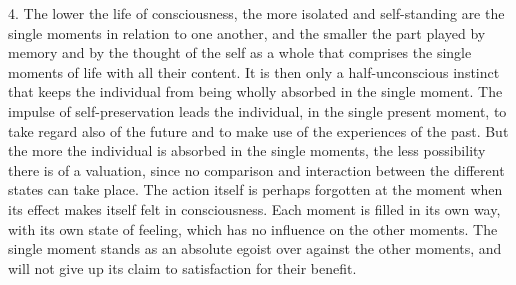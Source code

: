 \documentclass[12pt,a4paper,openany]{book}
\newcommand{\opage}[1]{\marginnote{\footnotesize\textit{[#1]}}}
\begin{document}
4. The lower the life of consciousness, the more isolated and self-standing are the single moments
in relation to one another, and the smaller the part played by memory and by the thought of the self
as a whole that comprises the single moments of life with all their content. It is then only a
half-unconscious instinct that keeps the individual from being wholly absorbed in the single moment.
The impulse of self-preservation leads the individual, in the single present moment, to take regard
also of the future and to make use of the experiences of the past. But the more the individual is
absorbed in the single moments, the less possibility there is of a valuation, since no comparison
and interaction between the different states can take place. The action itself is perhaps
forgotten at the moment when its effect makes itself felt
\opage{30}in consciousness. Each moment is filled in its own way, with its own state of feeling, which has
no influence on the other moments. The single moment stands as an absolute egoist over against the
other moments, and will not give up its claim to satisfaction for their benefit.
\end{document}

